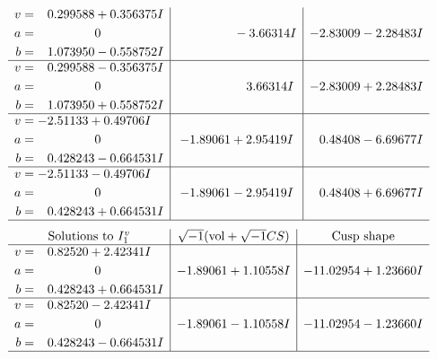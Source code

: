 \documentclass[1p]{elsarticle_modified}
\theoremstyle{definition}
\newcommand{\I}{\sqrt{-1}}
\begin{document}
$$\begin{array}{c|c|c}
\begin{aligned}
v &= \phantom{-}0.299588 + 0.356375 I \\
a &= \phantom{-0.000000 } 0 \\
b &= \phantom{-}1.073950 - 0.558752 I\end{aligned}
 & \phantom{-0.000000 } -3.66314 I & -2.83009 - 2.28483 I \\ \hline\begin{aligned}
v &= \phantom{-}0.299588 - 0.356375 I \\
a &= \phantom{-0.000000 } 0 \\
b &= \phantom{-}1.073950 + 0.558752 I\end{aligned}
 & \phantom{-0.000000 -}3.66314 I & -2.83009 + 2.28483 I \\ \hline\begin{aligned}
v &= -2.51133 + 0.49706 I \\
a &= \phantom{-0.000000 } 0 \\
b &= \phantom{-}0.428243 - 0.664531 I\end{aligned}
 & -1.89061 + 2.95419 I & \phantom{-}0.48408 - 6.69677 I \\ \hline\begin{aligned}
v &= -2.51133 - 0.49706 I \\
a &= \phantom{-0.000000 } 0 \\
b &= \phantom{-}0.428243 + 0.664531 I\end{aligned}
 & -1.89061 - 2.95419 I & \phantom{-}0.48408 + 6.69677 I\\
 \hline 
 \end{array}$$\newpage$$\begin{array}{c|c|c}  
\text{Solutions to }I^v_{1}& \I (\text{vol} + \sqrt{-1}CS) & \text{Cusp shape}\\
 \hline 
\begin{aligned}
v &= \phantom{-}0.82520 + 2.42341 I \\
a &= \phantom{-0.000000 } 0 \\
b &= \phantom{-}0.428243 + 0.664531 I\end{aligned}
 & -1.89061 + 1.10558 I & -11.02954 + 1.23660 I \\ \hline\begin{aligned}
v &= \phantom{-}0.82520 - 2.42341 I \\
a &= \phantom{-0.000000 } 0 \\
b &= \phantom{-}0.428243 - 0.664531 I\end{aligned}
 & -1.89061 - 1.10558 I & -11.02954 - 1.23660 I\\
 \hline 
 \end{array}$$\newpage
\end{document}
